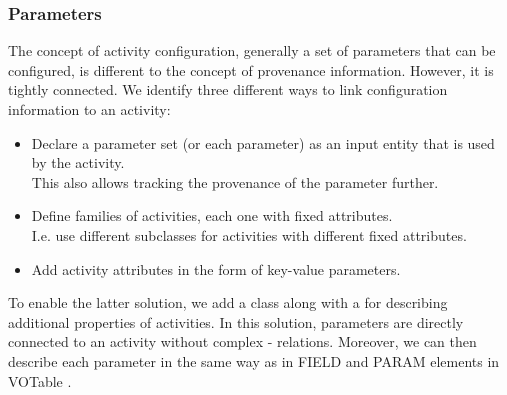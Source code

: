 



\subsubsection{Parameters}\label{sec:parameters}

The concept of activity configuration, generally a set of parameters that can be configured, is different to the concept of provenance information. However, it is tightly connected. We identify three different ways to link configuration information to an activity:
\begin{itemize}
\item Declare a parameter set (or each parameter) as an input entity that is used by the activity. \\
        This also allows tracking the provenance of the parameter further.
\item Define families of activities, each one with fixed attributes.\\
        I.e. use different subclasses for activities with different fixed attributes.
\item Add activity attributes in the form of key-value parameters.
\end{itemize}

To enable the latter solution, we add a  class along with a
 for describing additional properties of activities.
In this solution, parameters are directly connected to an activity without
complex - relations. Moreover, we can then describe each parameter
in the same way as in FIELD and PARAM elements in VOTable \citep{std:VOTABLE}.


